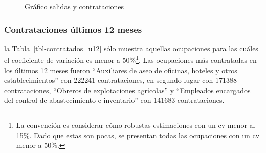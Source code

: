\documentclass[
  11pt,
]{article}
\begin{document}
\begin{figure}[H]

\caption{\label{fig-salidas_contrataciones}Gráfico salidas y
contrataciones}


\end{figure}%

\subsubsection{Contrataciones últimos 12
meses}\label{contrataciones-uxfaltimos-12-meses}

la Tabla~\ref{tbl-contratados_u12} sólo muestra aquellas ocupaciones
para las cuáles el coeficiente de variación es menor a 50\%\footnote{La
  convención es considerar cómo robustas estimaciones con un cv menor al
  15\%. Dado que estas son pocas, se presentan todas las ocupaciones con
  un cv menor a 50\%.}. Las ocupaciones más contratadas en los últimos
12 meses fueron ``Auxiliares de aseo de oficinas, hoteles y otros
establecimientos'' con 222241 contrataciones, en segundo lugar con
171388 contrataciones, ``Obreros de explotaciones agrícolas'' y
``Empleados encargados del control de abastecimiento e inventario'' con
141683 contrataciones. \FloatBarrier
\end{document}

